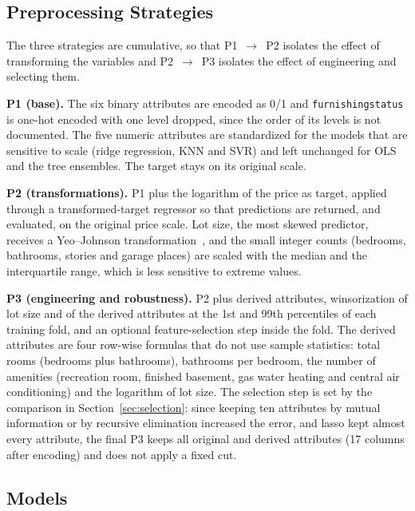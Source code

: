 \documentclass[conference]{IEEEtran}
\begin{document}
\subsection{Preprocessing Strategies}

The three strategies are cumulative, so that P1~$\rightarrow$~P2 isolates the effect of transforming the variables and P2~$\rightarrow$~P3 isolates the effect of engineering and selecting them.

\textbf{P1 (base).} The six binary attributes are encoded as 0/1 and \texttt{furnishingstatus} is one-hot encoded with one level dropped, since the order of its levels is not documented. The five numeric attributes are standardized for the models that are sensitive to scale (ridge regression, KNN and SVR) and left unchanged for OLS and the tree ensembles. The target stays on its original scale.

\textbf{P2 (transformations).} P1 plus the logarithm of the price as target, applied through a transformed-target regressor so that predictions are returned, and evaluated, on the original price scale. Lot size, the most skewed predictor, receives a Yeo--Johnson transformation~\cite{yeo2000}, and the small integer counts (bedrooms, bathrooms, stories and garage places) are scaled with the median and the interquartile range, which is less sensitive to extreme values.

\textbf{P3 (engineering and robustness).} P2 plus derived attributes, winsorization of lot size and of the derived attributes at the 1st and 99th percentiles of each training fold, and an optional feature-selection step inside the fold. The derived attributes are four row-wise formulas that do not use sample statistics: total rooms (bedrooms plus bathrooms), bathrooms per bedroom, the number of amenities (recreation room, finished basement, gas water heating and central air conditioning) and the logarithm of lot size. The selection step is set by the comparison in Section~\ref{sec:selection}: since keeping ten attributes by mutual information or by recursive elimination increased the error, and lasso kept almost every attribute, the final P3 keeps all original and derived attributes (17 columns after encoding) and does not apply a fixed cut.

\subsection{Models}
\end{document}
